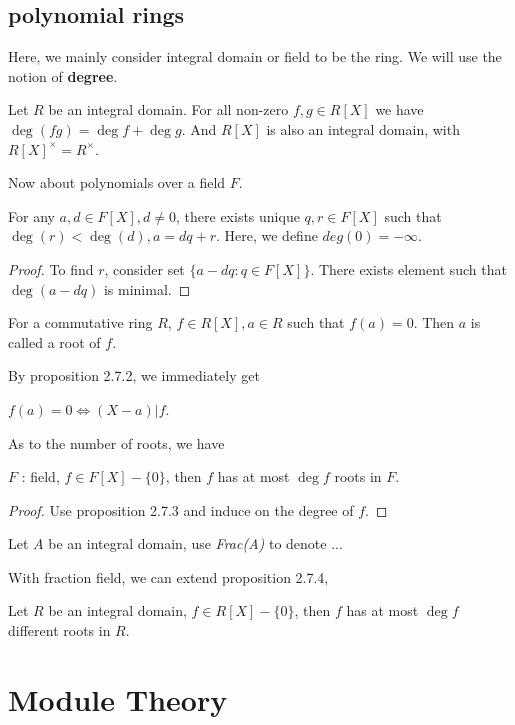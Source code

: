 \documentclass[11pt,fleqn]{book} %
\begin{document}
\begin{CJK}{UTF8}{gkai}
\section{polynomial rings}
Here, we mainly consider integral domain or field to be the ring. We will use the notion of {\bf degree}.
\begin{lemma}
	Let $R$ be an integral domain. For all non-zero $f, g \in R[X]$ we have $\deg (fg) = \deg f + \deg g$. And $R[X]$ is also an integral domain, with $R[X]^{\times} = R^{\times}$.
\end{lemma}

Now about polynomials over a field $F$.
\begin{proposition}
	[带余除法] For any $a,d \in F[X], d \neq 0$, there exists unique $q,r \in F[X]$ such that $\deg (r) <\deg (d), a = dq + r$. Here, we define $deg (0) = -\infty$.
\end{proposition}
\begin{proof}
	To find $r$, consider set $\{a - dq : q \in F[X]\}$. There exists element such that $\deg(a - dq)$ is minimal.	
\end{proof}

\begin{definition}
	[root] For a commutative ring $R$, $f \in R[X], a \in R$ such that $f(a) = 0$. Then $a$ is called a root of $f$.
\end{definition}

By proposition 2.7.2, we immediately get 
\begin{proposition}
	$f(a) = 0 \iff (X - a) | f$.
\end{proposition}

As to the number of roots, we have 
\begin{proposition}
	$F$ : field, $f \in F[X]-\{0\}$, then $f$ has at most $\deg f$ roots in $F$.
\end{proposition}
\begin{proof}
	Use proposition 2.7.3 and induce on the degree of $f$.
\end{proof}

\begin{definition}
	 Let $A$ be an integral domain, use {\it Frac(A)} to denote ... 
\end{definition}

With fraction field, we can extend proposition 2.7.4,
\begin{lemma}
	Let $R$ be an integral domain, $f \in R[X] - \{0\}$, then $f$ has at most $\deg f$ different roots in $R$.	
\end{lemma}

\chapter{Module Theory}

\end{CJK}
\end{document}
